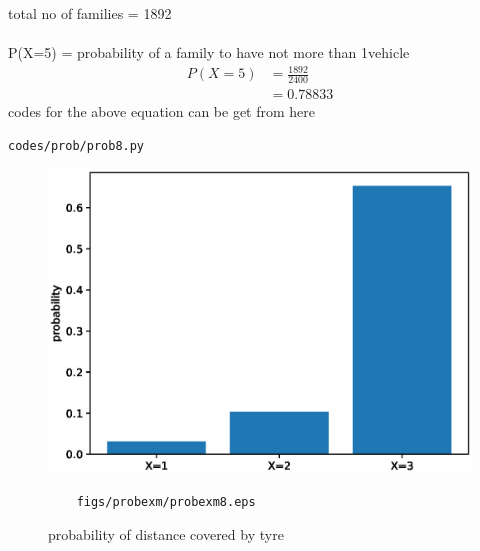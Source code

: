 \begin{enumerate}[label=\arabic*.,ref=\thesubsection.\theenumi]
total no of families  = 1892
\\
\\
P(X=5) = probability of a family to have not more than 1vehicle    
\begin{align}
P\left(X=5\right) &= \frac{1892}{2400}
\\
&= 0.78833
\end{align}
codes for the above equation can be get from here
\begin{lstlisting}
codes/prob/prob8.py
\end{lstlisting}
\begin{figure}[!ht]
	\centering
	\includegraphics[width=\columnwidth]{./figures/probexm/probexm8.eps}
	\caption{probability of distance covered by tyre }
	\label{fig:bt8}
	\begin{lstlisting}
	figs/probexm/probexm8.eps
	\end{lstlisting}
\end{figure}
\end{enumerate}